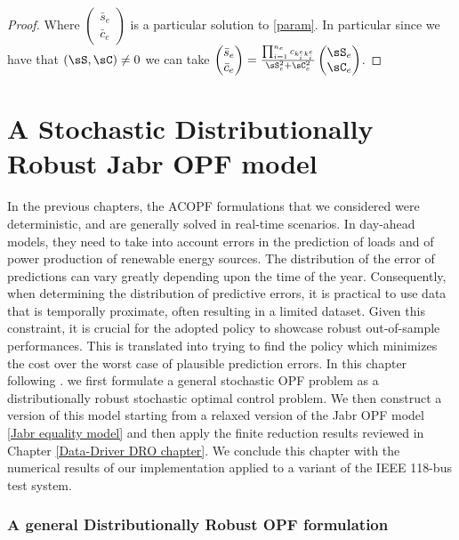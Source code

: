 \documentclass[11pt,a4paper,oneside,openany]{book}
\numberwithin{definition}{section}
\numberwithin{theorem}{section}
\numberwithin{problem}{section}
\begin{document}
\begin{proof}
Where $\begin{pmatrix}
    \bar s_e \\ \bar c_e
\end{pmatrix}$
is a particular solution to \eqref{param}. In particular since we have that $(\sS,\sC) \neq 0$ we can take \(
\begin{pmatrix}
    \bar s_e \\ \bar c_e
\end{pmatrix} =
 \frac{\prod_{i=1}^{n_e}c_{k^e_ik^e_i}}{\sS_e^2 + \sC_e^2}
    \begin{pmatrix}
        \sS_e \\ \sC_e
    \end{pmatrix} \).
\end{proof}



\chapter{A Stochastic Distributionally Robust Jabr OPF model} \label{A Stochastic OPF model chapter}
 In the previous chapters, the ACOPF formulations that we considered were deterministic, and are generally solved in real-time scenarios. In day-ahead models, they need to take into account errors in the prediction of loads and of power production of renewable energy sources. The distribution of the error of predictions can vary greatly depending upon the time of the year. Consequently, when determining the distribution of predictive errors, it is practical to use data that is temporally proximate, often resulting in a limited dataset. Given this constraint, it is crucial for the adopted policy to showcase robust out-of-sample performances.  This is translated into trying to find the policy which minimizes the cost over the worst case of plausible prediction errors.
In this chapter following  \cite{DBDRSOPF}. we first formulate a general stochastic OPF problem as a distributionally robust stochastic optimal control problem. We then construct a version of this model starting from a relaxed version of the Jabr OPF model \eqref{Jabr equality model} and then apply the finite reduction results reviewed in Chapter \ref{Data-Driver DRO chapter}. We conclude this chapter with the numerical results of our implementation applied to a variant of the IEEE 118-bus test system.

\subsection*{A general Distributionally Robust OPF formulation}
\end{document}
